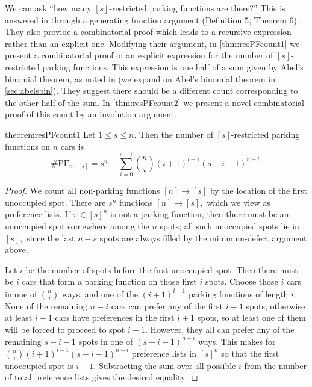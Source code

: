 \documentclass[12 pt]{amsart}
\theoremstyle{definition} %
\theoremstyle{remark} %
\begin{document}
We can ask ``how many $[s]$-restricted parking functions are there?'' This is answered in \cite{cameron-johannsen-prellberg-schweitzer-2008} through a generating function argument (Definition 5, Theorem 6). They also provide a combinatorial proof which leads to a recursive expression rather than an explicit one. Modifying their argument, in \cref{thm:resPFcount1} we present a combinatorial proof of an explicit expression for the number of $[s]$-restricted parking functions. This expression is one half of a sum given by Abel's binomial theorem, as noted in \cite{cameron-johannsen-prellberg-schweitzer-2008} (we expand on Abel's binomial theorem in \cref{sec:abelsbin}). They suggest there should be a different count corresponding to the other half of the sum. In \cref{thm:resPFcount2} we present a novel combinatorial proof of this count by an involution argument.

\begin{restatable}{theorem}{resPFcount1}
    \label{thm:resPFcount1}
    Let $1\le s\le n.$ Then the number of $[s]$-restricted parking functions on $n$ cars is
    \[\#\mathrm{PF}_{n\mid [s]}=s^{n} - \sum_{i = 0}^{s - 1} \binom{n}{i} (i + 1)^{i - 1} (s - i - 1)^{n - i}.\]
\end{restatable}

\begin{proof}
    We count all non-parking functions $[n]\to[s]$ by the location of the first unoccupied spot. There are $s^{n}$ functions $[n]\to[s],$ which we view as preference lists. If $\pi\in[s]^n$ is not a parking function, then there must be an unoccupied spot somewhere among the $n$ spots; all such unoccupied spots lie in $[s],$ since the last $n-s$ spots are always filled by the minimum-defect argument above.

	Let $i$ be the number of spots before the first unoccupied spot. Then there must be $i$ cars that form a parking function on those first $i$ spots. Choose those $i$ cars in one of $\binom{n}{i}$ ways, and one of the $(i + 1)^{i - 1}$ parking functions of length $i$. None of the remaining $n - i$ cars can prefer any of the first $i + 1$ spots; otherwise at least $i+1$ cars have preferences in the first $i+1$ spots, so at least one of them will be forced to proceed to spot $i+1$. However, they all can prefer any of the remaining $s - i - 1$ spots in one of $(s - i - 1)^{n - i}$ ways. This makes for $\binom{n}{i} (i + 1)^{i - 1}(s - i - 1)^{n - i}$ preference lists in $[s]^{n}$ so that the first unoccupied spot is $i + 1$. Subtracting the sum over all possible $i$ from the number of total preference lists gives the desired equality.
\end{proof}
\end{document}
